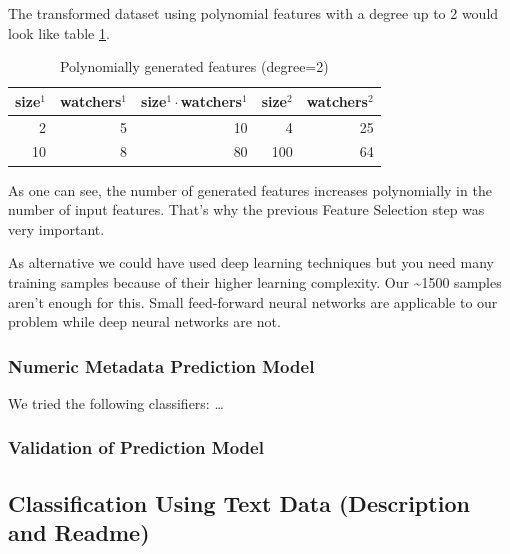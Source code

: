 \documentclass[%
a4paper,
DIV12,
2.5headlines,
bigheadings,
titlepage,
openbib,
]{scrartcl}
\begin{document}
The transformed dataset using polynomial features with a degree up to 2 would look like table \ref{example-feature-engineering-transformed}.

\begin{table}[]
\label{example-feature-engineering-transformed}
\centering
\caption{Polynomially generated features (degree=2)}
\begin{tabular}{|r|r|r|r|r|}
\hline
size$^1$ & watchers$^1$ & size$^1\cdot$watchers$^1$ & size$^2$ & watchers$^2$ \\ \hline
2 & 5 & 10 & 4 & 25 \\ \hline
10 & 8 & 80 & 100 & 64 \\ \hline
\end{tabular}
\end{table}

As one can see, the number of generated features increases polynomially in the number of input features.
That's why the previous Feature Selection step was very important.

As alternative we could have used deep learning techniques but you need many training samples because of their higher learning complexity.
Our \textasciitilde{}1500 samples aren't enough for this.
Small feed-forward neural networks are applicable to our problem while deep neural networks are not.

\subsubsection{Numeric Metadata Prediction
Model}\label{numeric-metadata-prediction-model}

We tried the following classifiers: \ldots{}




\subsubsection{Validation of Prediction
Model}\label{validation-of-prediction-model}


\subsection{Classification Using Text Data (Description and
Readme)}\label{classification-using-text-data-description-and-readme}
\end{document}
